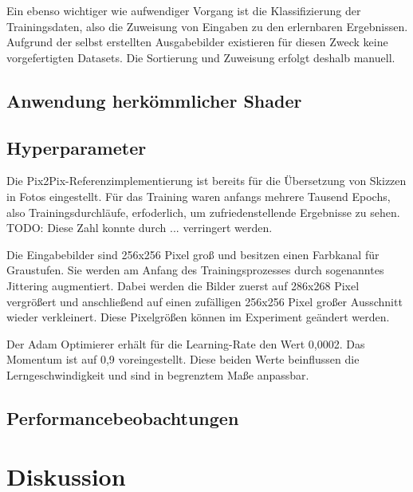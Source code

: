 Ein ebenso wichtiger wie aufwendiger Vorgang ist die Klassifizierung der Trainingsdaten, also die Zuweisung von Eingaben zu den erlernbaren Ergebnissen. Aufgrund der selbst erstellten Ausgabebilder existieren für diesen Zweck keine vorgefertigten Datasets. Die Sortierung und Zuweisung erfolgt deshalb manuell.



\section{Anwendung herkömmlicher Shader}
\label{sec:shader}

\section{Hyperparameter}
\label{sec:hyperparams}
Die Pix2Pix-Referenzimplementierung ist bereits für die Übersetzung von Skizzen in Fotos eingestellt. Für das Training waren anfangs mehrere Tausend Epochs, also Trainingsdurchläufe, erfoderlich, um zufriedenstellende Ergebnisse zu sehen. TODO: Diese Zahl konnte durch ... verringert werden.

Die Eingabebilder sind 256x256 Pixel groß und besitzen einen Farbkanal für Graustufen. Sie werden am Anfang des Trainingsprozesses durch sogenanntes Jittering augmentiert. Dabei werden die Bilder zuerst auf 286x268 Pixel vergrößert und anschließend auf einen zufälligen 256x256 Pixel großer Ausschnitt wieder verkleinert. Diese  Pixelgrößen können im Experiment geändert werden.

Der Adam Optimierer \cite{kingma2017adam} erhält für die Learning-Rate den Wert 0,0002. Das Momentum ist auf 0,9 voreingestellt. Diese beiden Werte beinflussen die Lerngeschwindigkeit und sind in begrenztem Maße anpassbar.

\section{Performancebeobachtungen}
\label{sec:performance}


\chapter{Diskussion}
\label{sec:conclusion}

